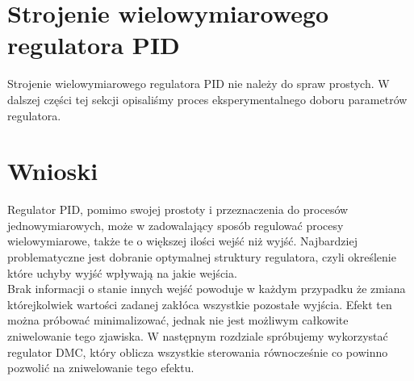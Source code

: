 \section{Strojenie wielowymiarowego regulatora PID}
\label{pro_pid_strojenie}

Strojenie wielowymiarowego regulatora PID nie należy do spraw prostych.
W dalszej części tej sekcji opisaliśmy proces eksperymentalnego 
doboru parametrów regulatora.





\section{Wnioski}
\label{pro_pid_wnioski}

Regulator PID, pomimo swojej prostoty i przeznaczenia do 
procesów jednowymiarowych, może w zadowalający sposób 
regulować procesy wielowymiarowe, także te o większej ilości wejść 
niż wyjść. Najbardziej problematyczne jest dobranie optymalnej struktury
regulatora, czyli określenie które uchyby wyjść wpływają na jakie wejścia.\\

Brak informacji o stanie innych wejść powoduje w każdym przypadku że 
zmiana którejkolwiek wartości zadanej zakłóca wszystkie pozostałe wyjścia.
Efekt ten można próbować minimalizować, jednak nie jest możliwym całkowite
zniwelowanie tego zjawiska. W następnym rozdziale spróbujemy wykorzystać regulator
DMC, który oblicza wszystkie sterowania równocześnie co powinno pozwolić na 
zniwelowanie tego efektu. 